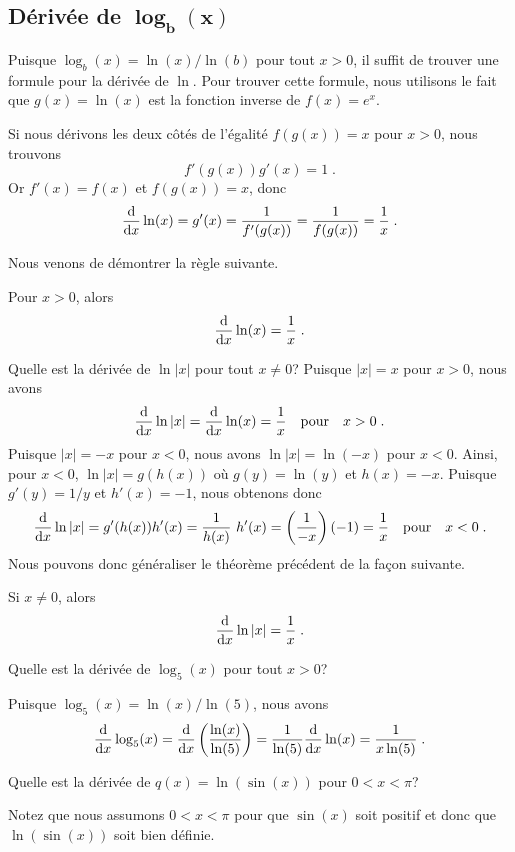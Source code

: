 {\subsection{Dérivée de $\mathbf{\log_b(x)}$}

Puisque $\log_b(x) = \ln(x) / \ln(b)$ pour tout $x>0$, il suffit de
trouver une formule pour la dérivée de $\ln$.  Pour trouver cette
formule, nous utilisons le fait que $g(x)=\ln(x)$ est la fonction inverse
de $f(x) = e^x$.

Si nous dérivons les deux côtés de l'égalité $f(g(x))= x$ pour $x>0$,
nous trouvons
\[
f'(g(x))g'(x) = 1 \; .
\]
Or $f'(x) = f(x)$ et $f(g(x))=x$, donc
\[
\dfdx{\ln(x)}{x} = g'(x) = \frac{1}{f'(g(x))}
= \frac{1}{f(g(x))} = \frac{1}{x} \; .
\]

Nous venons de démontrer la règle suivante.

\begin{prop}
Pour $x>0$, alors
\[
\dfdx{\ln(x)}{x} = \frac{1}{x} \; .
\]
\end{prop}

Quelle est la dérivée de $\ln |x|$ pour tout $x \neq 0$?  Puisque
$|x|=x$ pour $x>0$, nous avons
\[
\dfdx{\ln|x|}{x} = \dfdx{\ln(x)}{x} = \frac{1}{x} \quad \text{pour}
\quad x>0 \;.
\]
Puisque $|x|=-x$ pour $x<0$, nous avons $\ln|x| = \ln(-x)$ pour $x<0$.
Ainsi, pour $x<0$, $\ln|x| = g(h(x))$ où $g(y) = \ln(y)$ et
$h(x) = -x$.  Puisque $g'(y) = 1/y$ et $h'(x) = -1$, nous obtenons donc
\[
\dfdx{\ln|x|}{x} = g'(h(x)) h'(x) = \frac{1}{h(x)} \ h'(x) =
\left(\frac{1}{-x}\right) (-1) = \frac{1}{x} \quad \text{pour} \quad x< 0 \; .
\]
Nous pouvons donc généraliser le théorème précédent de la façon suivante.

\begin{prop}
Si $x\neq 0$, alors
\[
\dfdx{\ln|x|}{x} = \frac{1}{x} \; .
\]
\end{prop}

\begin{egg}
Quelle est la dérivée de $\log_5(x)$ pour tout $x>0$?

Puisque $\log_5(x) = \ln(x)/\ln(5)$, nous avons
\[
\dfdx{\log_5(x)}{x} = \dfdx{\left(\frac{\ln(x)}{\ln(5)}\right)}{x}
= \frac{1}{\ln(5)} \dfdx{\ln(x)}{x}
= \frac{1}{x\ln(5)} \; .
\]
\end{egg}

\begin{egg}
Quelle est la dérivée de $q(x) = \ln( \sin(x) )$ pour $0 < x < \pi$?

Notez que nous assumons $0<x<\pi$ pour que $\sin(x)$ soit positif et
donc que $\ln(\sin(x))$ soit bien définie.


\end{egg}}
